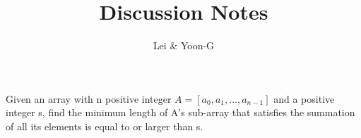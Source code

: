 \documentclass[12pt]{article}
\newenvironment{problem}[2][Problem]{\begin{trivlist}
\item[\hskip \labelsep {\bfseries #1}\hskip \labelsep {\bfseries #2.}]}{\end{trivlist}}
\begin{document}
 
 
\title{Discussion Notes}%
\author{Lei \& Yoon-G}
 
\maketitle
\begin{problem}{}
    \item[] Given an array with n positive integer $A=[a_0, a_1,..., a_{n-1}]$ and a positive integer s, find the minimum length of A's sub-array that satisfies the summation of all its elements is equal to or larger than s.
\end{problem}
\end{document}
